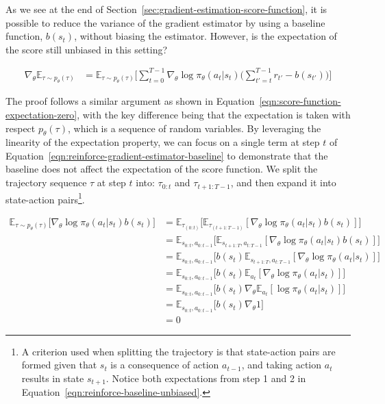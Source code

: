 \noindent As we see at the end of Section~\ref{sec:gradient-estimation-score-function}, it is possible to reduce the variance of the gradient estimator by using a baseline function, $b(s_{t})$, without biasing the estimator. However, is the expectation of the score still unbiased in this setting? 

\begin{equation}\label{eqn:reinforce-gradient-estimator-baseline}
    \begin{split}
        \nabla_{\theta}\mathbb{E}_{\tau\sim p_{\theta}(\tau)} &= \mathbb{E}_{\tau\sim p_{\theta}(\tau)} \bigg[\sum_{t=0}^{T-1}\nabla_{\theta}\log\pi_{\theta}(a_{t}|s_{t})  \bigg(\sum_{t'=t}^{T-1} r_{t'}-b(s_{t'}) \bigg)\bigg]
    \end{split}
\end{equation}

\noindent The proof follows a similar argument as shown in Equation~\ref{eqn:score-function-expectation-zero}, with the key difference being that the expectation is taken with respect $p_{\theta}(\tau)$, which is a sequence of random variables. By leveraging the linearity of the expectation property, we can focus on a single term at step $t$ of Equation~\ref{eqn:reinforce-gradient-estimator-baseline} to demonstrate that the baseline does not affect the expectation of the score function. We split the trajectory sequence $\tau$ at step $t$ into: $\tau_{0:t}$ and $\tau_{t+1:T-1}$, and then expand it into state-action pairs\footnote{A criterion used when splitting the trajectory is that state-action pairs are formed given that $s_{t}$ is a consequence of action $a_{t-1}$, and taking action $a_{t}$ results in state $s_{t+1}$. Notice both expectations from step 1 and 2 in Equation~\ref{eqn:reinforce-baseline-unbiased}.}.

\begin{equation}\label{eqn:reinforce-baseline-unbiased}
   \begin{split}
        \mathbb{E}_{\tau\sim p_{\theta}(\tau)}\big[\nabla_{\theta}\log\pi_{\theta}(a_t|s_t) b(s_t) \big] &=  \mathbb{E}_{\tau_{(0:t)}}\big[\mathbb{E}_{\tau_{(t+1:T-1)}}[ \nabla_{\theta}\log \pi_{\theta}(a_{t}|s_{t})b(s_{t})]\big]  \\
        &= \mathbb{E}_{s_{0:t}, a_{0:t-1}}\big[\mathbb{E}_{s_{t+1:T}, a_{t:T-1}}[ \nabla_{\theta}\log \pi_{\theta}(a_{t}|s_{t})b(s_{t})]\big] \\
        &= \mathbb{E}_{s_{0:t}, a_{0:t-1}}\big[b(s_{t})\mathbb{E}_{s_{t+1:T}, a_{t:T-1}}[ \nabla_{\theta}\log \pi_{\theta}(a_{t}|s_{t})]\big] \\
        &= \mathbb{E}_{s_{0:t}, a_{0:t-1}}\big[b(s_{t})\mathbb{E}_{a_{t}}[ \nabla_{\theta}\log \pi_{\theta}(a_{t}|s_{t})]\big] \\
        &= \mathbb{E}_{s_{0:t}, a_{0:t-1}}\big[b(s_{t})\nabla_{\theta}\mathbb{E}_{a_{t}}[\log \pi_{\theta}(a_{t}|s_{t})]\big] \\
        &= \mathbb{E}_{s_{0:t}, a_{0:t-1}}\big[b(s_{t})\nabla_{\theta}1\big] \\
        &= 0
   \end{split}
\end{equation}

